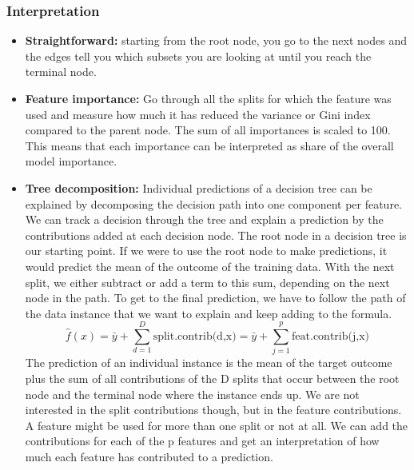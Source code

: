 \subsubsection{Interpretation}
\begin{itemize}
    \item \textbf{Straightforward:} starting from the root node, you go to the next nodes and the edges tell you
    which subsets you are looking at until you reach the terminal node.
    \item \textbf{Feature importance:} Go through all the splits for which the feature was used and measure how much it has reduced the
    variance or Gini index compared to the parent node. The sum of all importances is scaled to 100. This means that each importance can be interpreted as share of the overall model importance.
    \item \textbf{Tree decomposition:} Individual predictions of a decision tree can be explained by decomposing the decision path into one component per feature. We can track a decision through the tree and explain a prediction by the contributions added at each decision node.
    The root node in a decision tree is our starting point. If we were to use the root node to make predictions, it would predict the mean of the outcome of the training data. With the next split, we either subtract or add a term to this sum, depending on the next node in the path. To get to the final prediction, we have to follow the path of the data instance that we want to explain and keep adding to the formula.
    \begin{equation*}
        \hat{f}(x)=\bar{y}+\sum_{d=1}^D\text{split.contrib(d,x)}=\bar{y}+\sum_{j=1}^p\text{feat.contrib(j,x)}
    \end{equation*}
    The prediction of an individual instance is the mean of the target outcome plus the sum of all contributions of the D splits that occur between the root node and the terminal node where the instance ends up. We are not interested in the split contributions though, but in the feature contributions. A feature might be used for more than one split or not at all. We can add the contributions for each of the p features and get an interpretation of how much each feature has contributed to a prediction.
\end{itemize}


